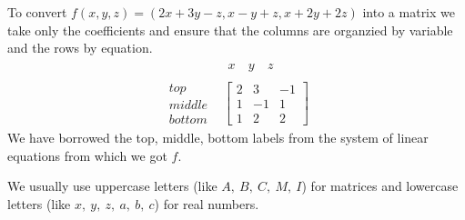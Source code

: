 \begin{example}
    To convert \(f(x,y,z) = ( 2x+3y-z , x-y+z , x+2y+2z )\) into a matrix we take only the coefficients and ensure that the columns are organzied by variable and the rows by equation.
    \[\begin{matrix}                                &\begin{matrix}x\ & y \ &z\end{matrix}\\
    \begin{matrix}top\\middle\\bottom\end{matrix}   &\begin{bmatrix}
        2 & 3 & -1 \\
        1 & -1 & 1 \\
        1 & 2 & 2
    \end{bmatrix}\end{matrix}\]
    We have borrowed the top, middle, bottom labels from the system of linear equations from which we got \(f.\)
\end{example}

We usually use uppercase letters (like \(A, \ B, \ C, \ M, \ I\)) for matrices and lowercase letters (like \(x, \ y, \ z, \ a, \ b, \ c\)) for real numbers.